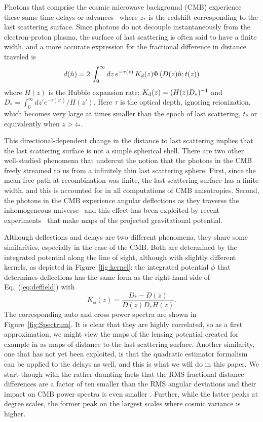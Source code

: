 \documentclass[prd,amsmath,amssymb,floatfix,superscriptaddress,nofootinbib,twocolumn]{revtex4-1}
\def\be{\begin{equation}}
\def\ee{\end{equation}}
\newcommand{\ec}[1]{Eq.~(\ref{eq:#1})}
\newcommand{\eql}[1]{\label{eq:#1}}
\newcommand{\rf}[1]{\ref{fig:#1}}
\begin{document}
Photons that comprise the cosmic microwave background (CMB) experience these same time delays or advances~\cite{Hu:2001yq} where $z_*$ is the redshift corresponding to the last scattering surface. Since photons do not decouple instantaneously from the electron-proton plasma, the surface of last scattering is often said to have a finite width, and a more accurate expression for the fractional difference in distance traveled is
\be
\fd(\hat n) = 2\, \int_0^{\infty} dz \, e^{-\tau(z)}\, K_\fd(z)\Phi\left(D(z)\hat n; t(z)\right)
\eql{deffield}
\ee
where $H(z)$ is the Hubble expansion rate; $K_d(z) =  (H(z)D_*)^{-1}$ and $D_* =  \int_0^\infty dz' e^{-\tau(z') }/H(z')$.  Here 
 $\tau$ is the optical depth, ignoring reionization, which becomes very large at times smaller than the epoch of  last scattering, $t_*$ or equivalently when $z>z_*$.

This directional-dependent change in the distance to last scattering implies that the last scattering surface is not a simple spherical shell. There are two other well-studied phenomena that undercut the notion that the photons in the CMB freely streamed to us from a infinitely thin last scattering sphere. First, since the mean free path at recombination was finite, the last scattering surface has a finite width, and this is accounted for in all computations of CMB anisotropies. Second, the photons in the CMB experience angular deflections as they traverse the inhomogeneous universe~\cite{Hu:2001tn,Lewis:2006fu} and this effect has been exploited by recent experiments~\cite{Smith:2007rg,Ade:2013tyw,Story:2014hni,Sherwin:2016tyf,Aghanim:2018oex} that make maps of the projected gravitational potential.

Although deflections and delays are two different phenomena, they share some similarities, especially in the case of the CMB. Both are determined by the integrated potential along the line of sight, although with slightly different kernels, as depicted in Figure~\rf{kernel}: the integrated potential $\phi$ that determines deflections has the same form as the right-hand side of \ec{deffield}  with
\be
K_\phi(z) = \frac{D_*-D(z)}{ D(z) D_* H(z)} .
\ee
The corresponding auto and cross power spectra are shown in Figure~\rf{Spectrum}.
It is clear that they are highly correlated, so as a first approximation, we might view the maps of the lensing potential created for example in \citet{Aghanim:2018oex} as maps of distance to the last scattering surface. Another similarity, one that has not yet been exploited, is that the quadratic estimator formalism  \cite{Hu:2001tn} can be applied to the delays as well, and this is what we will do in this paper.  We start though with the rather daunting facts that the RMS fractional distance differences are a factor of ten smaller than the RMS angular deviations 
 and their impact on CMB power spectra is even smaller \cite{Hu:2001yq}. Further, while the latter peaks at degree scales, the former peak on the largest scales where cosmic variance is
 higher.  
\end{document}
